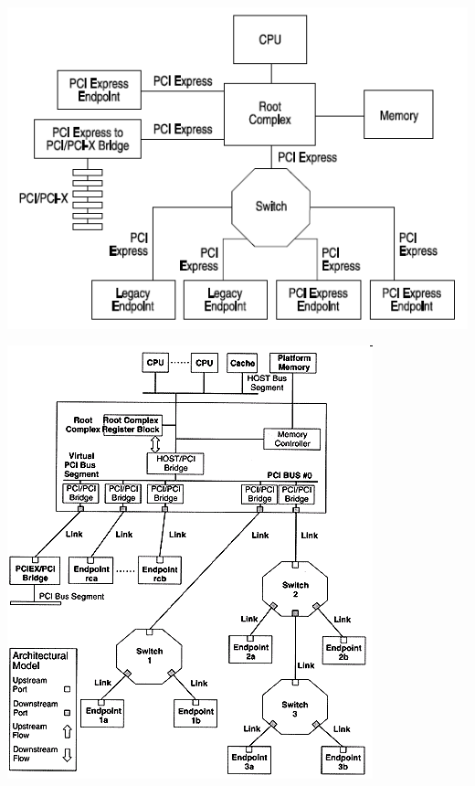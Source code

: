\documentclass[aspectratio=43]{beamer}
\begin{document}
\begin{frame}{}
	 
	\begin{center}
		\includegraphics[width=1\linewidth]{extrahovane_obrazky/img_2_page30_0.png}
	\end{center}
	
\end{frame}


\begin{frame}{}
	 
	\begin{center}
		\includegraphics[width=0.6\linewidth]{extrahovane_obrazky/img_2_page31_0.png}
	\end{center}
	
\end{frame}
\end{document}
